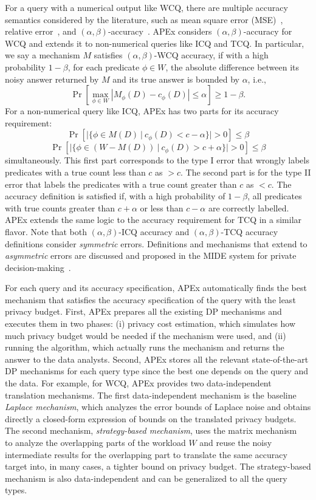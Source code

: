 For a query with a numerical output like WCQ, there are multiple accuracy semantics considered by the literature, such as mean square error (MSE)~\cite{XiaoBHG11relativeerror}, relative error~\cite{XiaoBHG11relativeerror}, and $(\alpha,\beta)$-accuracy~\cite{dwork2014algorithmic}. APEx considers $(\alpha,\beta)$-accuracy for WCQ and extends it to non-numerical queries like ICQ and TCQ. In particular, we say a mechanism $M$ satisfies $(\alpha,\beta)$-WCQ accuracy, if with a high probability $1-\beta$, for each predicate $\phi\in W$,
the absolute difference between its noisy answer returned by $M$ and its true answer is bounded by $\alpha$, i.e., $$\Pr[\max_{\phi\in W}|M_{\phi}(D)-c_{\phi}(D)|\leq \alpha]\geq 1-\beta.$$ For a non-numerical query like ICQ, APEx has two parts for its accuracy requirement: 
$$\Pr[|\{\phi \in M(D) ~|~ c_{\phi}(D) < c-\alpha\}|>0] \leq \beta$$
$$\Pr[|\{\phi \in (W-M(D)) ~|~ c_{\phi}(D) > c+\alpha\}|>0] \leq \beta$$ simultaneously. This first part corresponds to the type I error that wrongly labels predicates with a true count less than $c$ as $>c$. The second part is for the type II error that labels the predicates with a true count greater than $c$ as $<c$.
The accuracy definition is satisfied if, with a high probability of $1-\beta$, all predicates with true counts greater than $ c+\alpha$ or less than $ c-\alpha$ are correctly labelled.
APEx extends the same logic to the accuracy requirement for TCQ in a similar flavor.
Note that both $(\alpha,\beta)$-ICQ accuracy and $(\alpha,\beta)$-TCQ accuracy definitions consider \textit{symmetric} errors. 
Definitions and mechanisms that extend to \textit{asymmetric} errors are discussed and proposed in the MIDE system for private decision-making~\cite {Ghayyur2022mide}.


For each query and its accuracy specification, APEx automatically finds the best mechanism that satisfies the accuracy specification of the query with the least privacy budget. First, APEx prepares all the existing DP mechanisms and executes them in two phases: (i) privacy cost estimation, which simulates how much privacy budget would be needed if the mechanism were used, and (ii) running the algorithm, which actually runs the mechanism and returns the answer to the data analysts. Second, APEx stores all the relevant state-of-the-art DP mechanisms for each query type since the best one depends on the query and the data. For example, for WCQ, APEx provides two data-independent translation mechanisms. The first data-independent mechanism is the baseline \textit{Laplace mechanism}, which analyzes the error bounds of Laplace noise and obtains directly a closed-form expression of bounds on the translated privacy budgets.
The second mechanism, \textit{strategy-based mechanism}, 
uses the matrix mechanism~\cite{li2014data,LiMHMR15} to analyze the overlapping parts of the workload $W$ and reuse the noisy intermediate results for the overlapping part to translate the same accuracy target into, in many cases, a tighter bound on privacy budget. The strategy-based mechanism is also data-independent and can be generalized to all the query types.

